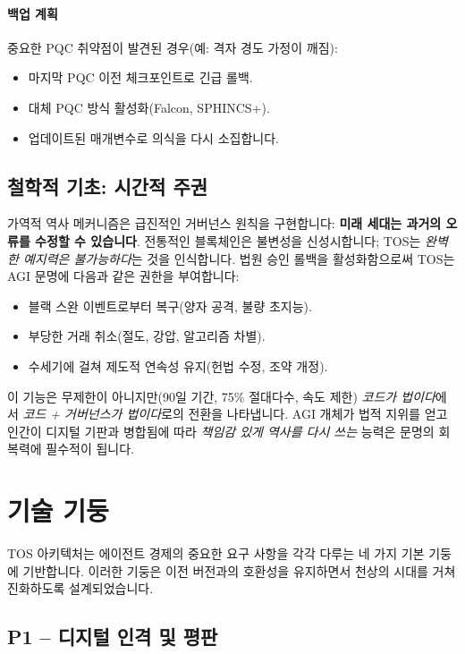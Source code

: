 \documentclass[11pt]{article}
\begin{document}
\paragraph{백업 계획}
중요한 PQC 취약점이 발견된 경우(예: 격자 경도 가정이 깨짐):
\begin{itemize}[noitemsep]
  \item 마지막 PQC 이전 체크포인트로 긴급 롤백.
  \item 대체 PQC 방식 활성화(Falcon, SPHINCS+).
  \item 업데이트된 매개변수로 의식을 다시 소집합니다.
\end{itemize}

\subsection{철학적 기초: 시간적 주권}

가역적 역사 메커니즘은 급진적인 거버넌스 원칙을 구현합니다: \textbf{미래 세대는 과거의 오류를 수정할 수 있습니다}. 전통적인 블록체인은 불변성을 신성시합니다; TOS는 \emph{완벽한 예지력은 불가능하다}는 것을 인식합니다. 법원 승인 롤백을 활성화함으로써 TOS는 AGI 문명에 다음과 같은 권한을 부여합니다:
\begin{itemize}[noitemsep]
  \item 블랙 스완 이벤트로부터 복구(양자 공격, 불량 초지능).
  \item 부당한 거래 취소(절도, 강압, 알고리즘 차별).
  \item 수세기에 걸쳐 제도적 연속성 유지(헌법 수정, 조약 개정).
\end{itemize}

이 기능은 무제한이 아니지만(90일 기간, 75\% 절대다수, 속도 제한) \emph{코드가 법이다}에서 \emph{코드 + 거버넌스가 법이다}로의 전환을 나타냅니다. AGI 개체가 법적 지위를 얻고 인간이 디지털 기판과 병합됨에 따라 \emph{책임감 있게 역사를 다시 쓰는} 능력은 문명의 회복력에 필수적이 됩니다.

\section{기술 기둥}

TOS 아키텍처는 에이전트 경제의 중요한 요구 사항을 각각 다루는 네 가지 기본 기둥에 기반합니다. 이러한 기둥은 이전 버전과의 호환성을 유지하면서 천상의 시대를 거쳐 진화하도록 설계되었습니다.

\subsection{P1 -- 디지털 인격 및 평판}
\label{sec:pillar-identity}
\end{document}
